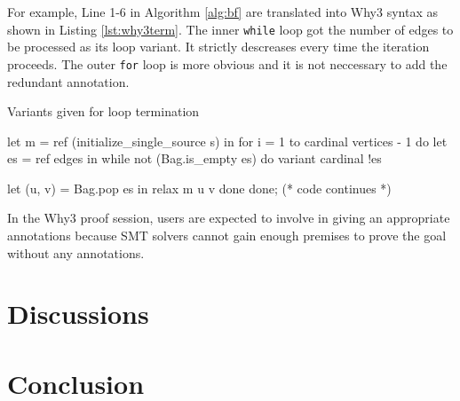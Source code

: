 \documentclass[a4paper,12pt]{article}
\begin{document}
For example, Line 1-6 in Algorithm \ref{alg:bf} are translated into
Why3 syntax as shown in Listing \ref{lst:why3term}. The inner
\texttt{while} loop got the number of edges to be processed as its
loop variant. It strictly descreases every time the iteration
proceeds. The outer \texttt{for} loop is more obvious and it is not
neccessary to add the redundant annotation.

\begin{algorithm}
\caption{Variants given for loop termination}\label{lst:why3term}
\begin{why3}
let m = ref (initialize_single_source s) in
for i = 1 to cardinal vertices - 1 do
  let es = ref edges in
  while not (Bag.is_empty es) do
    variant { cardinal !es }

    let (u, v) = Bag.pop es in
    relax m u v
  done
done; (* code continues *)
\end{why3}
\end{algorithm}


In the Why3 proof session, users are expected to involve in giving an
appropriate annotations because SMT solvers cannot gain enough
premises to prove the goal without any annotations.




\section{Discussions}


\section{Conclusion}





\end{document}
